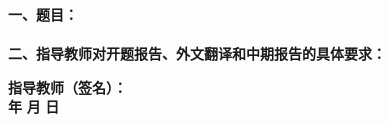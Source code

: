 
\newpage
\thispagestyle{empty}

\begin{tabbing}
\hspace{5mm}\songti\sihao \textbf{一、题目：}\underline{\makebox[12cm]{\zjutitlec}}
\\ \\
\hspace{5mm}\songti\sihao \textbf{二、指导教师对开题报告、外文翻译和中期报告的具体要求：}
\end{tabbing}

\vspace{100mm}

\begin{tabbing}
\hspace{80mm}\songti\xiaosi \textbf{指导教师（签名）：}
\\ \hspace{90mm} \songti\xiaosi \textbf{年} \hspace{5mm} \songti\xiaosi \textbf{月} \hspace{5mm} \songti\xiaosi \textbf{日}
\end{tabbing}

